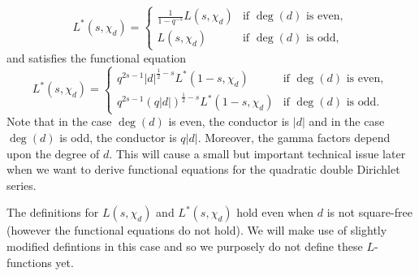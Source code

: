 \documentclass[12pt,reqno,oneside]{amsart}
\begin{document}
    \[
        L^{\ast}(s,\chi_{d}) = \begin{cases} \frac{1}{1-q^{-s}}L(s,\chi_{d}) & \text{if $\deg(d)$ is even}, \\ L(s,\chi_{d}) & \text{if $\deg(d)$ is odd}, \end{cases}
    \]
    and satisfies the functional equation
    \[
        L^{\ast}(s,\chi_{d}) = \begin{cases} q^{2s-1}|d|^{\frac{1}{2}-s}L^{\ast}(1-s,\chi_{d}) & \text{if $\deg(d)$ is even}, \\ q^{2s-1}(q|d|)^{\frac{1}{2}-s}L^{\ast}(1-s,\chi_{d}) & \text{if $\deg(d)$ is odd}. \end{cases}
    \]
    Note that in the case $\deg(d)$ is even, the conductor is $|d|$ and in the case $\deg(d)$ is odd, the conductor is $q|d|$. Moreover, the gamma factors depend upon the degree of $d$. This will cause a small but important technical issue later when we want to derive functional equations for the quadratic double Dirichlet series.

    \begin{remark}
        The definitions for $L(s,\chi_{d})$ and $L^{\ast}(s,\chi_{d})$ hold even when $d$ is not square-free (however the functional equations do not hold). We will make use of slightly modified defintions in this case and so we purposely do not define these $L$-functions yet.
    \end{remark}
\end{document}
